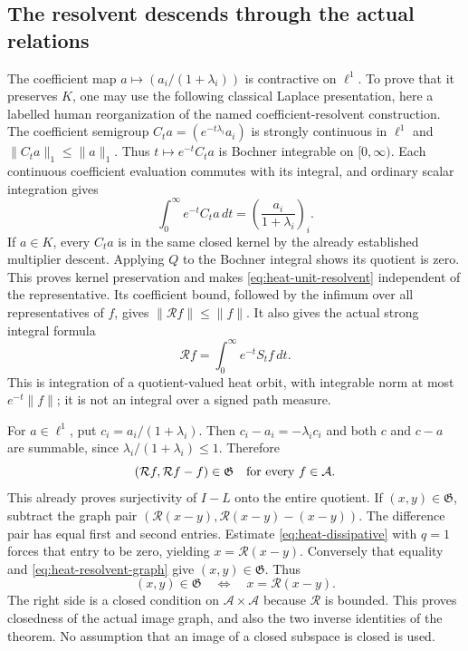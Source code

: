 \documentclass[11pt]{article}
\theoremstyle{remark}\newtheorem{remark}[theorem]{Remark}
\newcommand{\A}{\mathcal A}\newcommand{\X}{\mathcal X}
\begin{document}
\subsection{The resolvent descends through the actual relations}
The coefficient map $a\mapsto(a_i/(1+\lambda_i))$ is contractive
on $\ell^1$. To prove that it preserves $K$, one may use the
following classical Laplace presentation, here a labelled human
reorganization of the named coefficient-resolvent construction.
The coefficient semigroup $C_ta=(e^{-t\lambda_i}a_i)$ is strongly
continuous in $\ell^1$ and $\|C_ta\|_1\leq\|a\|_1$. Thus
$t\mapsto e^{-t}C_ta$ is Bochner integrable on $[0,\infty)$.
Each continuous coefficient evaluation commutes with its integral,
and ordinary scalar integration gives
\[
 \int_0^\infty e^{-t}C_ta\,dt
   =\left(\frac{a_i}{1+\lambda_i}\right)_i.
\]
If $a\in K$, every $C_ta$ is in the same closed kernel by the
already established multiplier descent. Applying $Q$ to the
Bochner integral shows its quotient is zero. This proves kernel
preservation and makes \eqref{eq:heat-unit-resolvent} independent
of the representative. Its coefficient bound, followed by the
infimum over all representatives of $f$, gives $\|\mathcal Rf\|\leq\|f\|$.
It also gives the actual strong integral formula
\begin{equation}\label{eq:heat-laplace-human}
 \mathcal Rf=\int_0^\infty e^{-t}S_tf\,dt.
\end{equation}
This is integration of a quotient-valued heat orbit, with integrable
norm at most $e^{-t}\|f\|$; it is not an integral over a signed
path measure.

For $a\in\ell^1$, put $c_i=a_i/(1+\lambda_i)$. Then
$c_i-a_i=-\lambda_i c_i$ and both $c$ and $c-a$ are summable,
since $\lambda_i/(1+\lambda_i)\leq1$. Therefore
\begin{equation}\label{eq:heat-resolvent-graph}
 (\mathcal Rf,\mathcal Rf-f)\in\mathfrak G
 \quad\hbox{for every }f\in\A.
\end{equation}
This already proves surjectivity of $I-L$ onto the entire quotient.
If $(x,y)\in\mathfrak G$, subtract the graph pair
$(\mathcal R(x-y),\mathcal R(x-y)-(x-y))$.
The difference pair has equal first and second entries.
Estimate \eqref{eq:heat-dissipative} with $q=1$ forces that entry
to be zero, yielding $x=\mathcal R(x-y)$. Conversely that equality
and \eqref{eq:heat-resolvent-graph} give $(x,y)\in\mathfrak G$.
Thus
\begin{equation}\label{eq:heat-graph-resolvent}
 (x,y)\in\mathfrak G\quad\Longleftrightarrow\quad
 x=\mathcal R(x-y).
\end{equation}
The right side is a closed condition on $\A\times\A$ because
$\mathcal R$ is bounded. This proves closedness of the actual
image graph, and also the two inverse identities of the theorem.
No assumption that an image of a closed subspace is closed is used.
\end{document}
